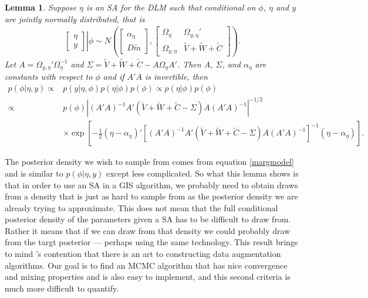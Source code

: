 \documentclass[12pt]{article}
\newtheorem{lem}{Lemma}
\begin{document}
\begin{lem}\label{noSA}
Suppose $\eta$ is an SA for the DLM such that conditional on $\phi$, $\eta$ and $y$ are jointly normally distributed, that is
\begin{align*}
 \left. \begin{bmatrix}\eta \\ y \end{bmatrix}\right|\phi \sim N\left(\begin{bmatrix} \alpha_\eta \\ D\tilde{m} \end{bmatrix}, \begin{bmatrix}
   \Omega_\eta & \Omega_{y,\eta}' \\
   \Omega_{y,\eta} & \tilde{V} + \tilde{W} + \tilde{C} \end{bmatrix}\right).
\end{align*}
Let $A=\Omega_{y,\eta}'\Omega_{\eta}^{-1}$ and $\Sigma = \tilde{V} + \tilde{W} + \tilde{C} - A\Omega_{\eta}A'$. Then $A$, $\Sigma$, and $\alpha_{\eta}$ are constants with respect to $\phi$ and if $A'A$ is invertible, then
\begin{align*}
p(\phi|\eta,y) \propto & p(y|\eta,\phi)p(\eta|\phi)p(\phi) \propto p(\eta|\phi)p(\phi) \\
\propto & p(\phi)|(A'A)^{-1}A'(\tilde{V} + \tilde{W} + \tilde{C} - \Sigma)A(A'A)^{-1}|^{-1/2}\\
&\times \exp\left[-\frac{1}{2}(\eta - \alpha_{\eta})'[(A'A)^{-1}A'(\tilde{V} + \tilde{W} + \tilde{C} - \Sigma)A(A'A)^{-1}]^{-1}(\eta - \alpha_{\eta})\right].
\end{align*}
\end{lem}
\noindent The posterior density we wish to sample from comes from equation \eqref{margmodel} and is similar to $p(\phi|\eta,y)$ except less complicated. So what this lemma shows is that in order to use an SA in a GIS algorithm, we probably need to obtain draws from a density that is just as hard to sample from as the posterior density we are already trying to approximate. This does not mean that the full conditional posterior density of the parameters given a SA has to be difficult to draw from. Rather it means that if we can draw from that density we could probably draw from the targt posterior --- perhaps using the same technology. This result brings to mind \citet{van2001art}'s contention that there is an art to constructing data augmentation algorithms. Our goal is to find an MCMC algorithm that has nice convergence and mixing properties and is also easy to implement, and this second criteria is much more difficult to quantify.
\end{document}

